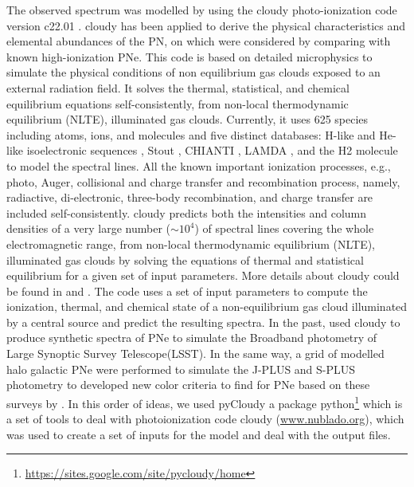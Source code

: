 \documentclass[fleqn,usenatbib]{mnras}
\begin{document}
The observed spectrum was modelled by using the {\sc cloudy}
photo-ionization code version c22.01 \citep{Ferland:2017}. {\sc cloudy}
has been applied to derive the physical characteristics and elemental
abundances of the PN, on which were considered by comparing with known
high-ionization PNe. This code is based on detailed microphysics to
simulate the physical conditions of non equilibrium gas clouds exposed to
an external radiation field. It solves the thermal, statistical, and chemical
equilibrium equations self-consistently, from non-local thermodynamic
equilibrium (NLTE), illuminated gas clouds. Currently, it uses 625
species including atoms, ions, and molecules and five distinct
databases: H-like and He-like isoelectronic sequences \citep{Porter:2012},
Stout \citep{Lykins:2015}, CHIANTI \citep{Landi:2012},
LAMDA \citep{Schoier:2005}, and the H2 molecule
\citep{Shaw:2005} to model the spectral lines. All the known
important ionization processes, e.g., photo, Auger, collisional
and charge transfer and recombination process, namely,
radiactive, di-electronic, three-body recombination, and charge
transfer are included self-consistently. {\sc cloudy} predicts both
the intensities and column densities of a very large number
($\sim 10^{4}$) of spectral lines covering the whole electromagnetic
range, from non-local thermodynamic equilibrium (NLTE),
illuminated gas clouds by solving the equations of thermal and
statistical equilibrium for a given set of input parameters. More
details about {\sc cloudy} could be found in \citet{Ferland:2013}
and \citet{Pandey:2022}. The code uses a set of input parameters to compute the
ionization, thermal, and chemical state of a non-equilibrium gas cloud
illuminated by a central source and predict the resulting spectra. 
In the past, \citet{Vejar:2019} used {\sc cloudy} to produce
synthetic spectra of PNe to simulate the Broadband photometry
of Large Synoptic Survey Telescope(LSST). In the same way, a grid of modelled
halo galactic PNe were performed to simulate the J-PLUS and S-PLUS photometry
to developed new color criteria to find for PNe based on these surveys
by \citet{Gutierrez-Soto:2020}.
In this order of ideas, we used {\sc pyCloudy} \citep{Morisset:2013} a
package python\footnote{\url{https://sites.google.com/site/pycloudy/home}} which
is a set of tools to deal with photoionization code {\sc cloudy} (\url{www.nublado.org}),
which was used to create a set of inputs for the model and deal with the output files.
\end{document}
